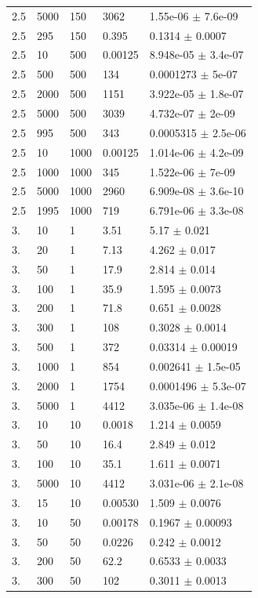 \begin{longtable}{lllll}
	2.5 & 5000 & 150 & 3062 & 1.55e-06 $\pm$ 7.6e-09 \\
	2.5 & 295 & 150 & 0.395 & 0.1314 $\pm$ 0.0007 \\
	2.5 & 10 & 500 & 0.00125 & 8.948e-05 $\pm$ 3.4e-07 \\
	2.5 & 500 & 500 & 134 & 0.0001273 $\pm$ 5e-07 \\
	2.5 & 2000 & 500 & 1151 & 3.922e-05 $\pm$ 1.8e-07 \\
	2.5 & 5000 & 500 & 3039 & 4.732e-07 $\pm$ 2e-09 \\
	2.5 & 995 & 500 & 343 & 0.0005315 $\pm$ 2.5e-06 \\
	2.5 & 10 & 1000 & 0.00125 & 1.014e-06 $\pm$ 4.2e-09 \\
	2.5 & 1000 & 1000 & 345 & 1.522e-06 $\pm$ 7e-09 \\
	2.5 & 5000 & 1000 & 2960 & 6.909e-08 $\pm$ 3.6e-10 \\
	2.5 & 1995 & 1000 & 719 & 6.791e-06 $\pm$ 3.3e-08 \\
	3. & 10 & 1 & 3.51 & 5.17 $\pm$ 0.021 \\
	3. & 20 & 1 & 7.13 & 4.262 $\pm$ 0.017 \\
	3. & 50 & 1 & 17.9 & 2.814 $\pm$ 0.014 \\
	3. & 100 & 1 & 35.9 & 1.595 $\pm$ 0.0073 \\
	3. & 200 & 1 & 71.8 & 0.651 $\pm$ 0.0028 \\
	3. & 300 & 1 & 108 & 0.3028 $\pm$ 0.0014 \\
	3. & 500 & 1 & 372 & 0.03314 $\pm$ 0.00019 \\
	3. & 1000 & 1 & 854 & 0.002641 $\pm$ 1.5e-05 \\
	3. & 2000 & 1 & 1754 & 0.0001496 $\pm$ 5.3e-07 \\
	3. & 5000 & 1 & 4412 & 3.035e-06 $\pm$ 1.4e-08 \\
	3. & 10 & 10 & 0.0018 & 1.214 $\pm$ 0.0059 \\
	3. & 50 & 10 & 16.4 & 2.849 $\pm$ 0.012 \\
	3. & 100 & 10 & 35.1 & 1.611 $\pm$ 0.0071 \\
	3. & 5000 & 10 & 4412 & 3.031e-06 $\pm$ 2.1e-08 \\
	3. & 15 & 10 & 0.00530 & 1.509 $\pm$ 0.0076 \\
	3. & 10 & 50 & 0.00178 & 0.1967 $\pm$ 0.00093 \\
	3. & 50 & 50 & 0.0226 & 0.242 $\pm$ 0.0012 \\
	3. & 200 & 50 & 62.2 & 0.6533 $\pm$ 0.0033 \\
	3. & 300 & 50 & 102 & 0.3011 $\pm$ 0.0013 \\

\end{longtable}
